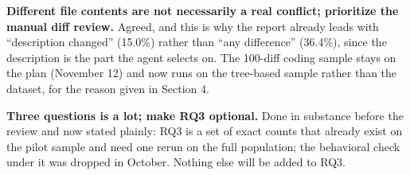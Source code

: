 \documentclass[10pt]{article}
\begin{document}
\textbf{Different file contents are not necessarily a real conflict; prioritize the manual diff review.} Agreed, and this
is why the report already leads with ``description changed'' (15.0\%) rather than ``any difference'' (36.4\%), since the
description is the part the agent selects on. The 100-diff coding sample stays on the plan (November 12) and now runs on
the tree-based sample rather than the dataset, for the reason given in Section 4.

\textbf{Three questions is a lot; make RQ3 optional.} Done in substance before the review and now stated plainly: RQ3 is
a set of exact counts that already exist on the pilot sample and need one rerun on the full population; the behavioral
check under it was dropped in October. Nothing else will be added to RQ3.

\small


\end{document}
